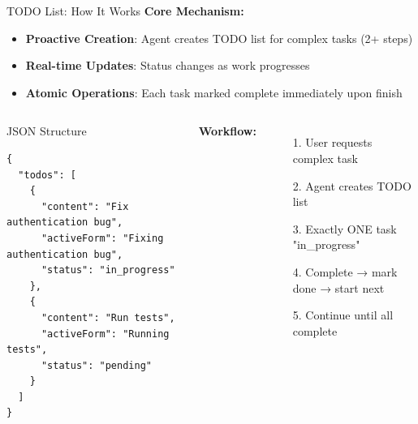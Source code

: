 \documentclass[aspectratio=169]{beamer}
\begin{document}
\begin{frame}[fragile]{TODO List: How It Works}
	\textbf{Core Mechanism:}
	\begin{itemize}
		\item {\color{highlight}\textbf{Proactive Creation}}: Agent creates TODO list for complex tasks (2+ steps)
		\item {\color{highlight}\textbf{Real-time Updates}}: Status changes as work progresses
		\item {\color{highlight}\textbf{Atomic Operations}}: Each task marked complete immediately upon finish
	\end{itemize}
	
	\begin{columns}
		\begin{block}{JSON Structure}
			\footnotesize
			\begin{lstlisting}
{
  "todos": [
    {
      "content": "Fix authentication bug",
      "activeForm": "Fixing authentication bug", 
      "status": "in_progress"
    },
    {
      "content": "Run tests",
      "activeForm": "Running tests",
      "status": "pending"  
    }
  ]
}
\end{lstlisting}
		\end{block}
		
		\textbf{Workflow:}
		\begin{itemize}
			\item[1.] User requests complex task
			\item[2.] Agent creates TODO list
			\item[3.] Exactly ONE task "in\_progress" 
			\item[4.] Complete → mark done → start next
			\item[5.] Continue until all complete
		\end{itemize}
	\end{columns}
\end{frame}
\end{document}
